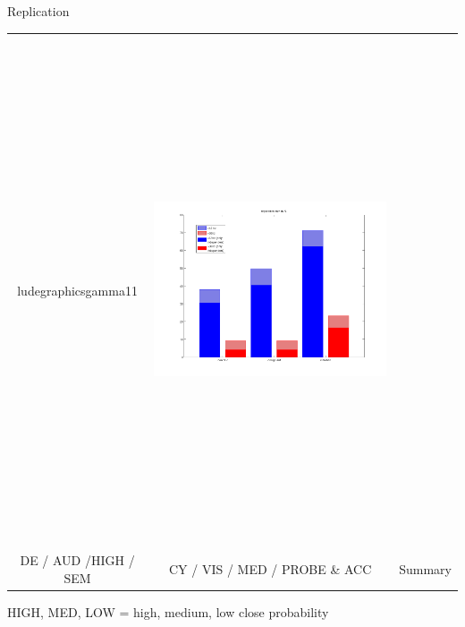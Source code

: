 \documentclass[final]{beamer}
\begin{document}
\begin{frame}{}
\begin{textblock}{67}
\begin{block}{Replication}
\begin{tabular}{c c c}
ludegraphics{gamma11} & \includegraphics[height=15cm]{reprate} \\
DE / AUD /HIGH / SEM & CY / VIS / MED / PROBE \& ACC &  Summary \\
\end{tabular}
\end{block}
HIGH, MED, LOW = high, medium, low close probability 


\end{textblock}
\end{frame}
\end{document}
